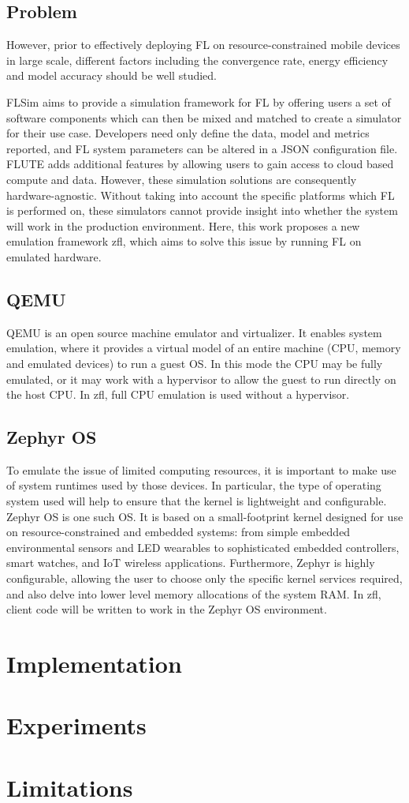 \documentclass[12pt]{article}
\begin{document}
\subsection{Problem}
However, prior to effectively deploying FL on resource-constrained mobile devices in large scale, different factors including the convergence rate, energy efficiency and model accuracy should be well studied.

FLSim\cite{} aims to provide a simulation framework for FL by offering users a set of software components
which can then be mixed and matched to create a simulator for their use case. Developers need only
define the data, model and metrics reported, and FL system parameters can be altered in a JSON
configuration file. FLUTE\cite{} adds additional features by allowing users to gain access to cloud based
compute and data. However, these simulation solutions are consequently hardware-agnostic. Without
taking into account the specific platforms which FL is performed on, these simulators cannot provide
insight into whether the system will work in the production environment. Here, this work proposes
a new emulation framework zfl, which aims to solve this issue by running FL on emulated hardware.
\subsection{QEMU}
QEMU\cite{} is an open source machine emulator and virtualizer. It enables system emulation, where it
provides a virtual model of an entire machine (CPU, memory and emulated devices) to run a guest OS.
In this mode the CPU may be fully emulated, or it may work with a hypervisor to allow the guest to
run directly on the host CPU. In zfl, full CPU emulation is used without a hypervisor.
\subsection{Zephyr OS}
To emulate the issue of limited computing resources, it is important to make use of system runtimes
used by those devices. In particular, the type of operating system used will help to ensure that the kernel is
lightweight and configurable.
Zephyr OS\cite{} is one such OS. It is based on a small-footprint kernel designed for use on resource-constrained and embedded systems: from simple embedded environmental sensors and LED wearables to sophisticated embedded controllers, smart watches, and IoT wireless applications.
Furthermore, Zephyr is highly configurable, allowing the user to choose only the specific kernel
services required, and also delve into lower level memory allocations of the system RAM. In zfl,
client code will be written to work in the Zephyr OS environment.
\section{Implementation}
\section{Experiments}
\section{Limitations}
\end{document}
